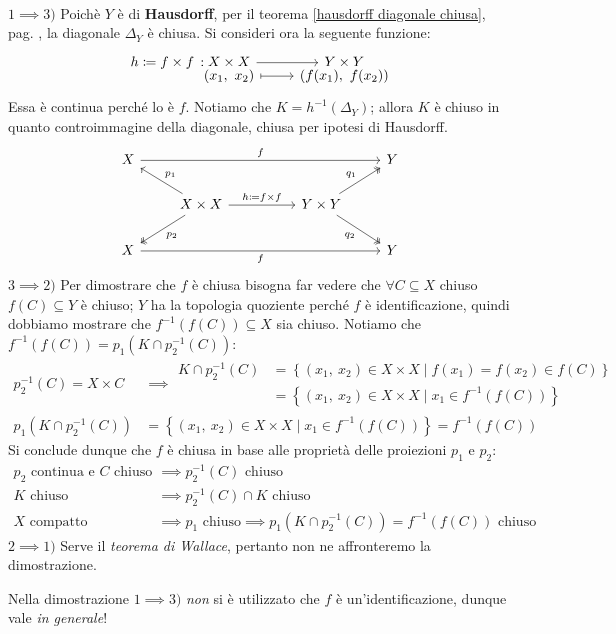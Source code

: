\begin{demonstration}~{}\\
	$1 \implies 3)$  Poichè $Y$ è di \textbf{Hausdorff}, per il teorema \ref{hausdorff diagonale chiusa}, pag. \pageref{hausdorff diagonale chiusa}, la diagonale $\Delta_Y$ è chiusa. Si consideri ora la seguente funzione:
	\begin{equation*}
		\funztot {h\coloneqq f\times f} {X\times X} {Y\times Y} {(x_1,\ x_2)} {\left( f(x_1), \ f(x_2) \right) }
	\end{equation*}
	Essa è continua perché lo è $f$. Notiamo che $K=h^{-1}(\Delta_Y)$; allora $K$ è chiuso in quanto controimmagine della diagonale, chiusa per ipotesi di Hausdorff.
	\[\begin{tikzcd}
		X &&&& Y \\
		& {X\times X} && {Y\times Y} \\
		X &&&& Y
		\arrow["{h\coloneqq f\times f}", from=2-2, to=2-4]
		\arrow["{p_1}"', from=2-2, to=1-1]
		\arrow["{p_2}", two heads, from=2-2, to=3-1]
		\arrow["{q_2}"', two heads, from=2-4, to=3-5]
		\arrow["{q_1}", two heads, from=2-4, to=1-5]
		\arrow["f"', from=3-1, to=3-5]
		\arrow["f", from=1-1, to=1-5]
	\end{tikzcd}\]
	$3\implies 2)$ Per dimostrare che $f$ è chiusa bisogna far vedere che $\forall C\subseteq X$ chiuso $f(C)\subseteq Y$ è chiuso; $Y$ ha la topologia quoziente perché $f$ è identificazione, quindi dobbiamo mostrare che $f^{-1}\left( f(C) \right)\subseteq X$ sia chiuso. Notiamo che $f^{-1}\left( f(C) \right)= p_1(K\cap p_2^{-1}(C))$:
	\begin{equation*}
		\begin{array}{ll}
		p_2^{-1}(C)=X\times C & \implies
		\begin{array}{ll}
			K\cap p_2^{-1}(C) & = \left\{ (x_1,\ x_2)\in X\times X \mid f(x_1)=f(x_2)\in f\left(C\right) \right\}\\
			& = \left\{ (x_1,\ x_2)\in X\times X \mid x_1\in f^{-1}\left(f\left(C\right)\right) \right\}
		\end{array}\\
		p_1(K\cap p_2^{-1}(C)) & = \left\{ (x_1,\ x_2)\in X\times X \mid x_1\in f^{-1}\left(f\left(C\right)\right) \right\}=f^{-1}\left( f(C) \right)
	\end{array}
	\end{equation*}
	Si conclude dunque che $f$ è chiusa in base alle proprietà delle proiezioni $p_1$ e $p_2$:
		\begin{equation*}
			\begin{array}{ll}
				p_2 \text{ continua e $C$ chiuso } & \implies p_2^{-1}(C) \text{ chiuso} \\
				K \text{ chiuso } &\implies p_2^{-1}(C)\cap K \text{ chiuso}\\
				X \text{ compatto} & \implies p_1 \text{ chiuso}\implies p_1 \left( K\cap p_2^{-1}(C) \right)=f^{-1}\left( f(C)\right) \text{ chiuso}
			\end{array}
		\end{equation*}
	$2\implies 1)$ Serve il \textit{teorema di Wallace}, pertanto non ne affronteremo la dimostrazione.
\end{demonstration}
\begin{observe}
	Nella dimostrazione $1\implies 3)$ \textit{non} si è utilizzato che $f$ è un'identificazione, dunque vale \textit{in generale}!
\end{observe}

